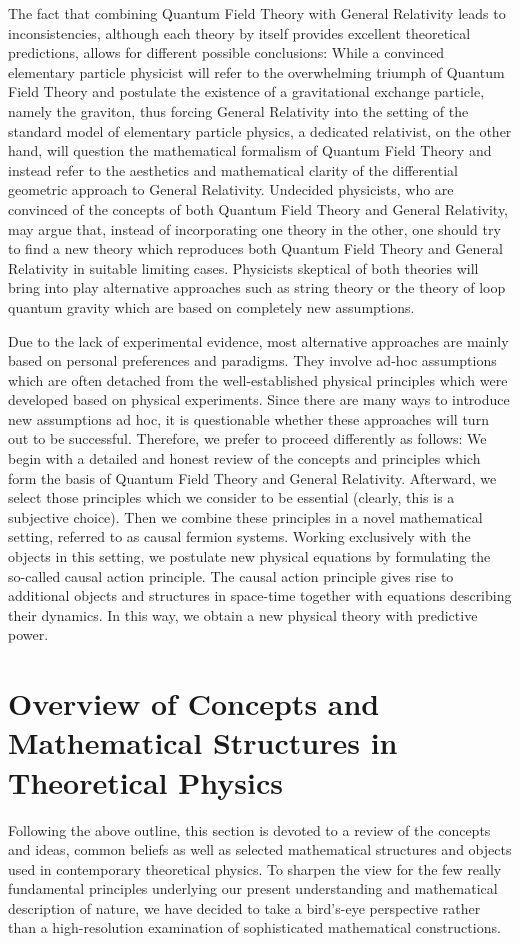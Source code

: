 \documentclass[reqno,11pt]{amsart}
\numberwithin{equation}{section}
\newcommand{\1}{\mbox{\rm 1 \hspace{-1.05 em} 1}}
\begin{document}
The fact that combining Quantum Field Theory with General Relativity leads to 
inconsistencies,
although each theory by itself provides excellent theoretical predictions, allows for different possible
conclusions: While a convinced elementary particle physicist will refer to the overwhelming triumph of Quantum Field Theory and postulate the existence of a gravitational exchange particle, namely the graviton, thus forcing General Relativity into the setting of the standard model of elementary particle physics, a dedicated relativist, on the other hand, will question the mathematical formalism of Quantum Field Theory and instead refer to the aesthetics and mathematical
clarity of the differential geometric approach to General Relativity. Undecided physicists, who are convinced of the concepts of both Quantum Field Theory and General Relativity, may argue that, instead of
incorporating one theory in the other, one should try to find a new theory which reproduces both
Quantum Field Theory and General Relativity in suitable limiting cases.
Physicists skeptical of both theories will bring into play alternative approaches such as string theory or the theory of loop quantum gravity which are based on completely new assumptions.

Due to the lack of experimental evidence, most alternative approaches are
mainly based on personal preferences and paradigms. They involve ad-hoc assumptions which are
often detached from the well-established physical principles which were developed based on physical experiments.
Since there are many ways to introduce new assumptions ad hoc, it is questionable whether
these approaches will turn out to be successful.
Therefore, we prefer to proceed differently as follows:
We begin with a detailed and honest review of the concepts and principles which form the basis
of Quantum Field Theory and General Relativity.
Afterward, we select those principles which we consider to be essential
(clearly, this is a subjective choice).
Then we combine these principles in a novel mathematical setting, referred to as causal fermion systems.
Working exclusively with the objects in this setting, we postulate new physical equations by formulating
the so-called causal action principle. The causal action principle gives rise to additional objects and
structures in space-time together with equations describing their dynamics.
In this way, we obtain a new physical theory with predictive power.

\section{Overview of Concepts and Mathematical Structures in Theoretical Physics}
Following the above outline, this section is devoted to a review of the concepts and ideas, common beliefs as well as selected mathematical structures and objects used in contemporary theoretical physics. To sharpen the view for the few really fundamental principles underlying our present understanding and mathematical description of nature, we have decided to take a bird's-eye perspective rather than a high-resolution examination of sophisticated mathematical constructions.
\end{document}
